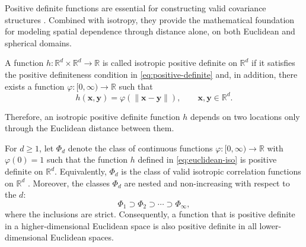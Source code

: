 \documentclass[12pt]{report} %
\newcommand{\bx}{\mathbf{x}}
\newcommand{\by}{\mathbf{y}}
\begin{document}

Positive definite functions are essential for constructing valid covariance structures \citep{Meilan-Vila2021a}. Combined with isotropy, they provide the mathematical foundation for modeling spatial dependence through distance alone, on both Euclidean and spherical domains.



A function $h:\mathbb{R}^d\times\mathbb{R}^d\to\mathbb{R}$ is called isotropic positive definite on $\mathbb{R}^d$ if it satisfies the positive definiteness condition in \eqref{eq:positive-definite} and, in addition, there exists a function $\varphi:[0,\infty)\to\mathbb{R}$ such that
\begin{equation}
    \label{eq:euclidean-iso}
     h(\bx,\by)=\varphi(\|\bx-\by\|),
    \qquad \bx,\by\in\mathbb{R}^d.
\end{equation}

Therefore, an isotropic positive definite function $h$ depends on two locations only through the Euclidean distance between them.

For $d \geq 1$, let $\Phi_d$ denote the class of continuous functions
$\varphi:[0,\infty)\to\mathbb{R}$ with $\varphi(0)=1$ such that the function $h$ defined in \eqref{eq:euclidean-iso} is positive definite on $\mathbb{R}^d$. Equivalently, $\Phi_d$ is the class of valid isotropic correlation functions on
$\mathbb{R}^d$ \citep{Gneiting2013}. Moreover, the classes $\Phi_d$ are nested and non-increasing with respect to the $d$:
\[
    \Phi_1 \supset \Phi_2 \supset \cdots \supset \Phi_\infty,
\]
where the inclusions are strict. Consequently, a function that is positive
definite in a higher-dimensional Euclidean space is also positive definite in
all lower-dimensional Euclidean spaces.
\end{document}
